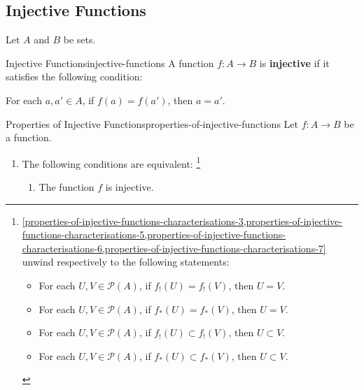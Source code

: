 \subsection{Injective Functions}\label{subsection-injective-functions}
Let $A$ and $B$ be sets.
\begin{definition}{Injective Functions}{injective-functions}%
    A function $f\colon A\to B$ is \textbf{injective} if it satisfies the following condition:
    \begin{itemize}
        \itemstar For each $a,a'\in A$, if $f(a)=f(a')$, then $a=a'$.
    \end{itemize}
\end{definition}
\begin{proposition}{Properties of Injective Functions}{properties-of-injective-functions}%
    Let $f\colon A\to B$ be a function.
    \begin{enumerate}
        \item\label{properties-of-injective-functions-characterisations}The following conditions are equivalent:%
            \footnote{%
                \cref{properties-of-injective-functions-characterisations-3,properties-of-injective-functions-characterisations-5,properties-of-injective-functions-characterisations-6,properties-of-injective-functions-characterisations-7} unwind respectively to the following statements:
                \begin{itemize}
                    \item For each $U,V\in\mathcal{P}(A)$, if $f_{!}(U)=f_{!}(V)$, then $U=V$.%
                    \item For each $U,V\in\mathcal{P}(A)$, if $f_{*}(U)=f_{*}(V)$, then $U=V$.
                    \item For each $U,V\in\mathcal{P}(A)$, if $f_{!}(U)\subset f_{!}(V)$, then $U\subset V$.
                    \item For each $U,V\in\mathcal{P}(A)$, if $f_{*}(U)\subset f_{*}(V)$, then $U\subset V$.
                \end{itemize}
                \par\vspace*{\TCBBoxCorrection}
            }%
            \begin{enumerate}
                \item\label{properties-of-injective-functions-characterisations-1}The function $f$ is injective.

\end{enumerate}
\end{enumerate}
\end{proposition}
